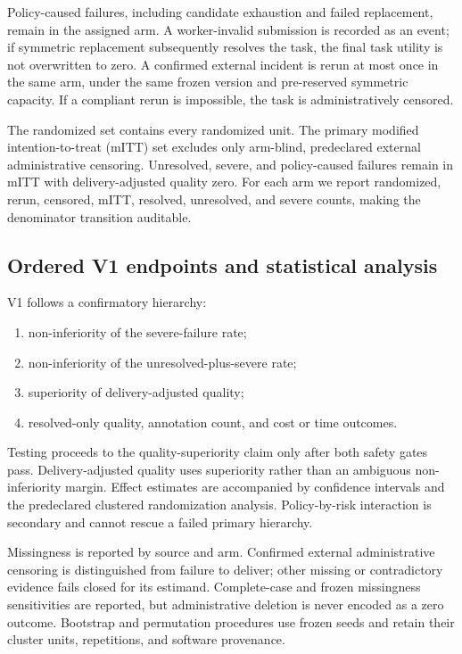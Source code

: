 Policy-caused failures, including candidate exhaustion and failed replacement, remain in the assigned arm. A worker-invalid submission is recorded as an event; if symmetric replacement subsequently resolves the task, the final task utility is not overwritten to zero. A confirmed external incident is rerun at most once in the same arm, under the same frozen version and pre-reserved symmetric capacity. If a compliant rerun is impossible, the task is administratively censored.

The randomized set contains every randomized unit. The primary modified intention-to-treat (mITT) set excludes only arm-blind, predeclared external administrative censoring. Unresolved, severe, and policy-caused failures remain in mITT with delivery-adjusted quality zero. For each arm we report randomized, rerun, censored, mITT, resolved, unresolved, and severe counts, making the denominator transition auditable.

\subsection{Ordered V1 endpoints and statistical analysis}

V1 follows a confirmatory hierarchy:

\begin{enumerate}
  \item non-inferiority of the severe-failure rate;
  \item non-inferiority of the unresolved-plus-severe rate;
  \item superiority of delivery-adjusted quality;
  \item resolved-only quality, annotation count, and cost or time outcomes.
\end{enumerate}

Testing proceeds to the quality-superiority claim only after both safety gates pass. Delivery-adjusted quality uses superiority rather than an ambiguous non-inferiority margin. Effect estimates are accompanied by confidence intervals and the predeclared clustered randomization analysis. Policy-by-risk interaction is secondary and cannot rescue a failed primary hierarchy.

Missingness is reported by source and arm. Confirmed external administrative censoring is distinguished from failure to deliver; other missing or contradictory evidence fails closed for its estimand. Complete-case and frozen missingness sensitivities are reported, but administrative deletion is never encoded as a zero outcome. Bootstrap and permutation procedures use frozen seeds and retain their cluster units, repetitions, and software provenance.

